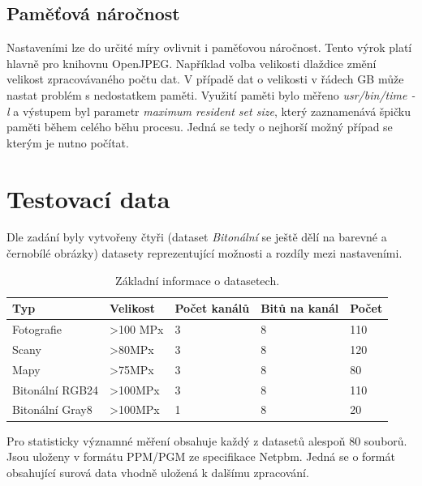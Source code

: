 \subsection*{Paměťová náročnost}
Nastaveními lze do určité míry ovlivnit i paměťovou náročnost. Tento výrok platí hlavně pro knihovnu OpenJPEG. Například volba velikosti dlaždice změní velikost zpracovávaného počtu dat. V případě dat o velikosti v řádech GB může nastat problém s nedostatkem paměti. Využití paměti bylo měřeno \textit{usr/bin/time -l} a výstupem byl parametr \textit{maximum resident set size}, který zaznamenává špičku paměti během celého běhu procesu. Jedná se tedy o nejhorší možný případ se kterým je nutno počítat.
\newpage
\section{Testovací data}
Dle zadání byly vytvořeny čtyři (dataset \textit{Bitonální} se ještě dělí na barevné a černobílé obrázky) datasety reprezentující možnosti a rozdíly mezi nastaveními.

\begin{table}[ht!]
  \centering
    \setlength{\tabcolsep}{3pt} %
    \renewcommand{\arraystretch}{1.15} %

    \begin{tabular}{|p{3.5cm}|p{3cm}|p{3cm}|p{3cm}|p{1.5cm}|}
      \hline
      \textbf{Typ} & \textbf{Velikost} & \textbf{Počet kanálů} & \textbf{Bitů na kanál} & \textbf{Počet} \\ 
      \hline

      Fotografie      & >100 MPx   & 3   & 8 & 110 \\ 
      Scany           & >80MPx     & 3   & 8   & 120 \\ 
      Mapy            & >75MPx     & 3   & 8   & 80 \\ 
      Bitonální RGB24 & >100MPx    & 3  & 8   & 110 \\ 
      Bitonální Gray8 & >100MPx    & 1  & 8   & 20 \\ 
      \hline
    \end{tabular}
    \caption{Základní informace o datasetech.} 
\end{table}

Pro statisticky významné měření obsahuje každý z datasetů alespoň 80 souborů. Jsou uloženy v formátu PPM/PGM ze specifikace Netpbm. Jedná se o formát obsahující surová data vhodně uložená k dalšímu zpracování.\\

